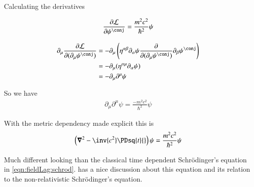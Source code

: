 Calculating the derivatives

\begin{align*}
\PD{\psi^\conj}{\LL} = \frac{m^2 c^2}{\hbar^2} \psi
\end{align*}

\begin{align*}
\partial_\mu \PD{(\partial_\mu \psi^\conj)}{\LL}
&= -\partial_\mu \left(\eta^{\alpha\beta}\partial_\alpha \psi \PD{(\partial_\mu \psi^\conj)}{} \partial_\beta \psi^\conj\right) \\
&= -\partial_\mu (\eta^{\alpha\mu}\partial_\alpha \psi) \\
&= -\partial_\mu \partial^\mu \psi \\
\end{align*}

So we have
\begin{align*}
\partial_\mu \partial^\mu \psi = \frac{-m^2 c^2}{\hbar^2} \psi
\end{align*}

%

%

With the metric dependency made explicit this is
\begin{align*}
\left(\spacegrad^2 - \inv{c^2}\PDsq{t}{}\right) \psi = \frac{m^2 c^2}{\hbar^2} \psi
\end{align*}

Much different looking than the classical time dependent Schr\"{o}dinger's equation in \ref{eqn:fieldLag:schrod}.
\cite{srednicki2007qft} has a nice discussion about this equation and its relation to the non-relativistic Schr\"{o}dinger's equation.

